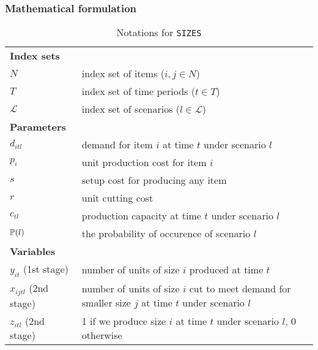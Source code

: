 \subsubsection{Mathematical formulation}
\begin{table}[H]
	\caption{Notations for \texttt{SIZES}}
	\label{notation}
	\resizebox{\textwidth}{!}
	{
		\begin{tabular}{ll}
			\toprule
			\textbf{Index sets} &  \\ 
			$N$ & \textrm{index set of items ($i,j\in N$)} \\ 
			$T$ & \textrm{index set of time periods ($t\in T$)} \\ 
			$\mathcal{L}$ & \textrm{index set of scenarios ($l\in\mathcal{L}$)}\\
			\textbf{Parameters} &   \\ 
			$d_{itl}$ &	demand for item $i$ at time $t$ under scenario $l$\\
			$p_{i}$ & unit production cost for item $i$\\
			$s$	& setup cost for producing any item\\
			$r$ & unit cutting cost\\ 
			$c_{tl}$ & production capacity at time $t$ under scenario $l$\\
			$\operatorname*{\mathbb{P}}(l)$ & the probability of occurence of scenario $l$\\
			\textbf{Variables} &  \\ 
			$y_{it}$ (1st stage)  & number of units of size $i$ produced at time $t$ \\
			$x_{ijtl}$ (2nd stage) & number of units of size $i$ cut to meet demand for smaller size $j$ at time $t$ under scenario $l$\\ 
			$z_{itl}$ (2nd stage)& 1 if we produce size $i$ at time $t$ under scenario $l$, 0 otherwise\\
			\hline
		\end{tabular}
	}
\end{table} 

